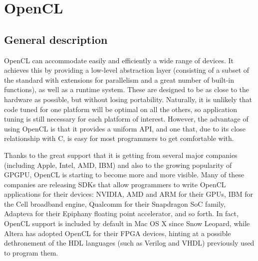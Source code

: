 \chapter{OpenCL}


\section{General description}
OpenCL can accommodate easily and efficiently a wide range of devices. It achieves this by providing a low-level abstraction layer (consisting of a subset of the \cstd standard with extensions for parallelism and a great number of built-in functions), as well as a runtime system. These are designed to be as close to the hardware as possible, but without losing portability. Naturally, it is unlikely that code tuned for one platform will be optimal on all the others, so application tuning is still necessary for each platform of interest. However, the advantage of using OpenCL is that it provides a uniform API, and one that, due to its close relationship with C, is easy for most programmers to get comfortable with.

Thanks to the great support that it is getting from several major companies (including Apple, Intel, AMD, IBM) and also to the growing popularity of GPGPU, OpenCL is starting to become more and more visible. Many of these companies are releasing SDKs that allow programmers to write OpenCL applications for their devices: NVIDIA, AMD and ARM for their GPUs, IBM for the Cell broadband engine, Qualcomm for their Snapdragon SoC family, Adapteva for their Epiphany floating point accelerator, and so forth. In fact, OpenCL support is included by default in Mac OS X since Snow Leopard\cite{http://www.apple.com/pr/library/2008/06/09Apple-Previews-Mac-OS-X-Snow-Leopard-to-Developers.html}, while Altera has adopted OpenCL for their FPGA devices\cite{http://www.altera.com/literature/wp/wp-01173-opencl.pdf}, hinting at a possible dethronement of the HDL languages (such as Verilog and VHDL) previously used to program them.

